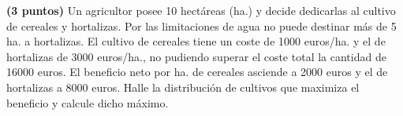 
\textbf{(3 puntos)} Un agricultor posee 10 hectáreas (ha.) y decide dedicarlas al cultivo de cereales y hortalizas. Por las limitaciones de agua no puede destinar más de 5 ha. a hortalizas. El cultivo de cereales tiene un coste de 1000 euros/ha. y el de hortalizas de 3000 euros/ha., no pudiendo superar el coste total la cantidad de 16000 euros. El beneficio neto por ha. de cereales asciende a 2000 euros y el de hortalizas a 8000 euros. Halle la distribución de cultivos que maximiza el beneficio y calcule dicho máximo.
